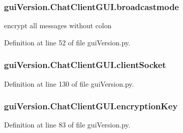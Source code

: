 \subsubsection[{broadcastmode}]{\setlength{\rightskip}{0pt plus 5cm}gui\+Version.\+Chat\+Client\+G\+U\+I.\+broadcastmode}\label{classgui_version_1_1_chat_client_g_u_i_a24c3049b3a6f498d56685eef5405baf6}


encrypt all messages without colon 



Definition at line 52 of file gui\+Version.\+py.

\hypertarget{classgui_version_1_1_chat_client_g_u_i_ad0d119fff1856994d498e1e9861451d5}{}
\subsubsection[{client\+Socket}]{\setlength{\rightskip}{0pt plus 5cm}gui\+Version.\+Chat\+Client\+G\+U\+I.\+client\+Socket}\label{classgui_version_1_1_chat_client_g_u_i_ad0d119fff1856994d498e1e9861451d5}


Definition at line 130 of file gui\+Version.\+py.

\hypertarget{classgui_version_1_1_chat_client_g_u_i_aafa39a201580f18372e0911d9667ccbd}{}
\subsubsection[{encryption\+Key}]{\setlength{\rightskip}{0pt plus 5cm}gui\+Version.\+Chat\+Client\+G\+U\+I.\+encryption\+Key}\label{classgui_version_1_1_chat_client_g_u_i_aafa39a201580f18372e0911d9667ccbd}


Definition at line 83 of file gui\+Version.\+py.

\hypertarget{classgui_version_1_1_chat_client_g_u_i_a61e070d785a0e8308bf1a26788075258}{}
